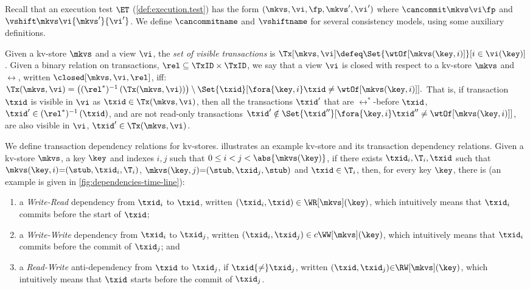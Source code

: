 Recall that an  execution test \(\ET\) (\cref{def:execution.test})
has the form \((\mkvs,\vi, \fp, \allowbreak \mkvs', \vi')\) 
where  \(\cancommit \mkvs \vi \fp\) and \(\vshift \mkvs \vi {\mkvs'} {\vi'}\). 
We define \(\cancommitname\) and \(\vshiftname\) for several consistency
models, using some auxiliary definitions. 


Given a kv-store \(\mkvs\) and a view \(\vi\), the {\em set of visible
transactions} is
\( \Tx[\mkvs, \vi]  \defeq \Set{\wtOf[\mkvs(\key, i)] }[ i \in \vi(\key)] \).
Given a binary relation on transactions, \(\rel \subseteq \TxID \times \TxID\),
we say that a view \(\vi\) is closed with respect to a kv-store \(\mkvs\) and \(\rel\), written \(\closed[\mkvs,\vi,\rel]\), iff:  
\(
	\Tx(\mkvs, \vi) = 
	\left( (\rel^*)^{-1} \left( \Tx(\mkvs, \vi) \right) \right) \setminus \Set{\txid }[ \fora{\key,i} \txid \neq \wtOf[\mkvs(\key,i)] ] .
\)
That is, if transaction \(\txid\) is visible in \(\vi\) as \( \txid \in \Tx(\mkvs, \vi) \),
then all the transactions \( \txid'  \) that are \(\rel^*\)-before \(\txid\), \ie \(\txid' \in (\rel^*)^{-1} \left( \txid \right)\),
and are not read-only transactions \( \txid' \notin \Set{\txid'' }[ \fora{\key,i} \txid'' \neq \wtOf[\mkvs(\key,i)] ] \),
are also visible in \(\vi\), \ie \( \txid' \in \Tx(\mkvs, \vi) \).

We define transaction dependency relations for kv-stores.
 illustrates an example kv-store and
its transaction dependency relations.
Given a kv-store \(\mkvs\), a key \(\key\) and 
indexes \(i,j\) such that  \(0 \leq i < j < \abs{ \mkvs(\key) }\), 
if there exists \(\txid_i, \T_i, \txid\) such that 
\(\mkvs(\key, i)  {=} (\stub, \txid_{i}, \T_{i})\), \(\mkvs(\key,j) {=} (\stub, \txid_{j}, \stub)\)
and \(\txid \in \T_{i}\), 
then, for every key \( \key \), there is (an example is given in \cref{fig:dependencies-time-line}):

\begin{enumerate} 
\item a \emph{Write-Read} dependency from \(\txid_{i}\) to \(\txid\), written \((\txid_{i},\txid) \in \WR[\mkvs](\key)\),
which  intuitively means that \( \txid_{i} \) commits before the start of \( \txid \);
\item a \emph{Write-Write} dependency from \(\txid_{i}\) to \(\txid_{j}\), 
written \((\txid_{i},\txid_{j}) \in c\WW[\mkvs](\key) \),
which intuitively means that \( \txid_{i} \) commits before the commit of \( \txid_j \); and 
\item a \emph{Read-Write} anti-dependency from \(\txid\) to \(\txid_{j}\), if 
\(\txid {\neq} \txid_{j}\), written \((\txid,\txid_j) {\in} \RW[\mkvs](\key)\),
which intuitively  means that \( \txid \) starts before the commit of \( \txid_j \).
\end{enumerate}

